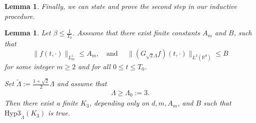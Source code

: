 \documentclass[11pt,a4paper,reqno]{amsart}
\theoremstyle{plain}
\newtheorem{lemma}[proposition]{Lemma}
\theoremstyle{definition}
\begin{document}
\begin{lemma}
Finally, we can state and prove the second step in our inductive procedure.

\end{lemma}
\begin{lemma}\label{lem:induction2-3}
	    	Let $\beta\leq \frac{1}{T_0}$.  Asssume that there exist finite constants $A_m$ and $B$, such that
    	\begin{equation}\label{eq:ind2-assumption1-3}
    	\|f(t, \cdot)\|_{L^1_m} \leq A_m , \quad  \text{and } \quad 	\| (G_{\sqrt{2}\Lambda} f)(t, \cdot) \|_{L^2({\mathbb{R}}^d)} \le B
    	\end{equation}
    	for some integer $m\geq 2$ and for all $0\le t\le T_0$.
    	
	Set $\widetilde{\Lambda}:= \frac{1+\sqrt{2}}{2} \Lambda$
		and assume that
	\begin{align}\label{eq:ind2-3-assumption2}
		\Lambda\ge \Lambda_0 := 3 .
	\end{align}
Then there exist a finite $K_3$, depending only on $d,m,A_m$, and $B$ such that  $\mathrm{Hyp3}_{\widetilde{\Lambda}}(K_3)$ is true.
\end{lemma}
\end{document}
